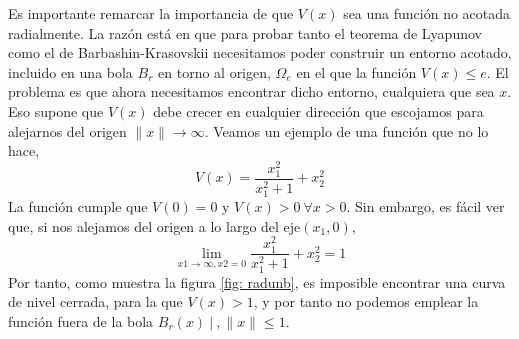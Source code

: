 Es importante remarcar la importancia de que $V(x)$ sea una función no acotada radialmente. La razón está en que para probar tanto el teorema de Lyapunov como el de Barbashin-Krasovskii necesitamos poder construir un entorno acotado, incluido en una bola $B_r$ en torno al origen, $\Omega_e$ en el que la función $V(x) \leq e$. El problema es que ahora necesitamos encontrar dicho entorno, cualquiera que sea $x$. Eso supone que $V(x)$ debe crecer en cualquier dirección que escojamos para alejarnos del origen $\|x\| \to \infty$. Veamos un ejemplo de una  función que no lo hace, 
\begin{equation*}
V(x) = \frac{x_1^2}{x_1^2+1}+x_2^2
\end{equation*}
 La función cumple que $V(0) = 0$ y $V(x) >0\ \forall x>0$. Sin embargo, es fácil ver que, si nos alejamos del origen a lo largo del eje$(x_1,0)$,
 \begin{equation}
 \lim_{x1\to\infty,x2=0} \frac{x_1^2}{x_1^2+1}+x_2^2 = 1
 \end{equation}
 Por tanto, como muestra la figura \ref{fig: radunb}, es imposible encontrar una curva de nivel cerrada, para la que $V(x) >1$, y por tanto no podemos emplear la función fuera de la bola $B_r(x)\ \vert\ , \|x\| \leq 1$.
 
